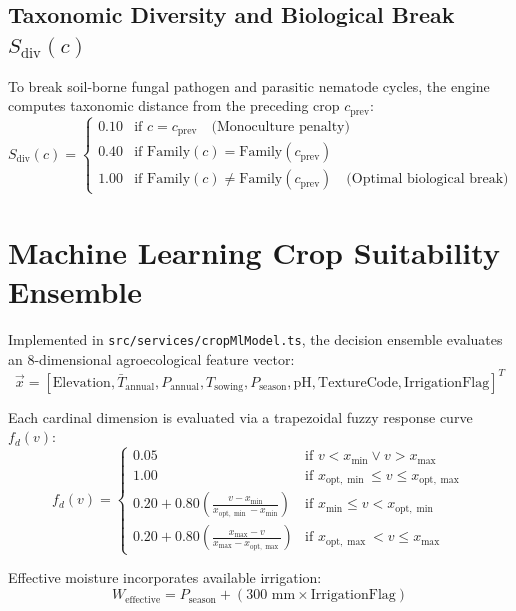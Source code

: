 \documentclass[11pt,a4paper]{report}
\begin{document}
\subsection{Taxonomic Diversity and Biological Break $S_{\text{div}}(c)$}
To break soil-borne fungal pathogen and parasitic nematode cycles, the engine computes taxonomic distance from the preceding crop $c_{\text{prev}}$:
\begin{equation}
  S_{\text{div}}(c) = \begin{cases}
    0.10 & \text{if } c = c_{\text{prev}} \quad \text{(Monoculture penalty)} \\
    0.40 & \text{if } \text{Family}(c) = \text{Family}(c_{\text{prev}}) \\
    1.00 & \text{if } \text{Family}(c) \ne \text{Family}(c_{\text{prev}}) \quad \text{(Optimal biological break)}
  \end{cases}
\end{equation}

\section{Machine Learning Crop Suitability Ensemble}
Implemented in \texttt{src/services/cropMlModel.ts}, the decision ensemble evaluates an 8-dimensional agroecological feature vector:
\begin{equation}
  \vec{x} = [\text{Elevation}, \bar{T}_{\text{annual}}, P_{\text{annual}}, T_{\text{sowing}}, P_{\text{season}}, \text{pH}, \text{TextureCode}, \text{IrrigationFlag}]^T
\end{equation}

Each cardinal dimension is evaluated via a trapezoidal fuzzy response curve $f_d(v)$:
\begin{equation}
  f_d(v) = \begin{cases}
    0.05 & \text{if } v < x_{\min} \lor v > x_{\max} \\
    1.00 & \text{if } x_{\text{opt},\min} \le v \le x_{\text{opt},\max} \\
    0.20 + 0.80 \left( \frac{v - x_{\min}}{x_{\text{opt},\min} - x_{\min}} \right) & \text{if } x_{\min} \le v < x_{\text{opt},\min} \\
    0.20 + 0.80 \left( \frac{x_{\max} - v}{x_{\max} - x_{\text{opt},\max}} \right) & \text{if } x_{\text{opt},\max} < v \le x_{\max}
  \end{cases}
\end{equation}

Effective moisture incorporates available irrigation:
\begin{equation}
  W_{\text{effective}} = P_{\text{season}} + (300\text{ mm} \times \text{IrrigationFlag})
\end{equation}
\end{document}
